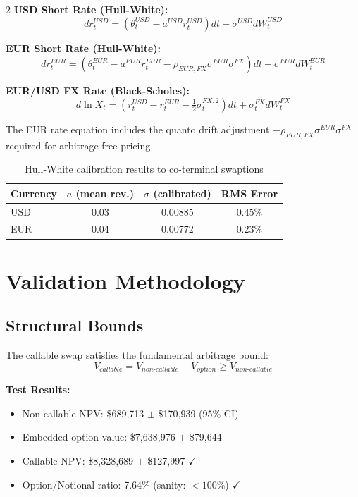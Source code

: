 \documentclass[11pt,a4paper]{article}
\begin{document}
\begin{multicols}{2}
\textbf{USD Short Rate (Hull-White):}
\[dr_t^{USD} = (\theta_t^{USD} - a^{USD} r_t^{USD})dt + \sigma^{USD} dW_t^{USD}\]

\textbf{EUR Short Rate (Hull-White):}
\[dr_t^{EUR} = (\theta_t^{EUR} - a^{EUR} r_t^{EUR} - \rho_{EUR,FX}\sigma^{EUR}\sigma^{FX})dt + \sigma^{EUR} dW_t^{EUR}\]
\end{multicols}

\textbf{EUR/USD FX Rate (Black-Scholes):}
\[d\ln X_t = (r_t^{USD} - r_t^{EUR} - \tfrac{1}{2}\sigma_t^{FX,2})dt + \sigma_t^{FX} dW_t^{FX}\]

The EUR rate equation includes the quanto drift adjustment $-\rho_{EUR,FX}\sigma^{EUR}\sigma^{FX}$ required for arbitrage-free pricing.

\begin{table}[H]
\centering
\begin{tabular}{lccc}
\toprule
\textbf{Currency} & $a$ (mean rev.) & $\sigma$ (calibrated) & RMS Error \\
\midrule
USD & 0.03 & 0.00885 & 0.45\% \\
EUR & 0.04 & 0.00772 & 0.23\% \\
\bottomrule
\end{tabular}
\caption{Hull-White calibration results to co-terminal swaptions}
\end{table}

\section{Validation Methodology}

\subsection{Structural Bounds}

The callable swap satisfies the fundamental arbitrage bound:
\[V_{callable} = V_{non\text{-}callable} + V_{option} \geq V_{non\text{-}callable}\]

\textbf{Test Results:}
\begin{itemize}
    \item Non-callable NPV: \$689,713 $\pm$ \$170,939 (95\% CI)
    \item Embedded option value: \$7,638,976 $\pm$ \$79,644
    \item Callable NPV: \$8,328,689 $\pm$ \$127,997 \textcolor{pass}{$\checkmark$}
    \item Option/Notional ratio: 7.64\% (sanity: $<100\%$) \textcolor{pass}{$\checkmark$}
\end{itemize}
\end{document}
